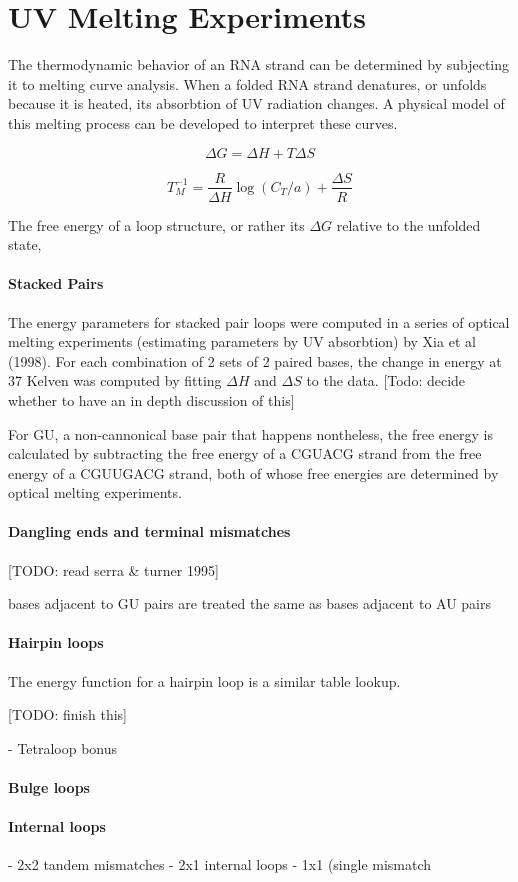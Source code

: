 \section{UV Melting Experiments}

The thermodynamic behavior of an RNA strand can be determined by
subjecting it to melting curve analysis. When a folded RNA strand
denatures, or unfolds because it is heated, its absorbtion of UV
radiation changes. A physical model of this melting process can be
developed to interpret these curves.

\begin{equation}
\Delta G = \Delta H + T \Delta S
\end{equation}

\begin{equation}
T_M^{-1} = \frac{R}{\Delta H} \log{(C_T/a)} + \frac{\Delta S}{R}
\end{equation}

The free energy of a loop structure, or rather its $\Delta G$ relative
to the unfolded state,

\paragraph{Stacked Pairs}

The energy parameters for stacked pair loops were computed in a series
of optical melting experiments (estimating parameters by UV
absorbtion) by Xia et al (1998). For each combination of 2 sets of 2
paired bases, the change in energy at 37 Kelven was computed by
fitting $\Delta H$ and $\Delta S$ to the data. [Todo: decide whether
to have an in depth discussion of this]

For GU, a non-cannonical base pair that happens nontheless, the free
energy is calculated by subtracting the free energy of a CGUACG strand
from the free energy of a CGUUGACG strand, both of whose free energies
are determined by optical melting experiments.


\paragraph{Dangling ends and terminal mismatches}

[TODO: read serra \& turner 1995]

bases adjacent to GU pairs are treated the same as bases adjacent to AU pairs

\paragraph{Hairpin loops}

The energy function for a hairpin loop is a similar table lookup.

[TODO: finish this]

- Tetraloop bonus

\paragraph{Bulge loops}

\paragraph{Internal loops}
- 2x2 tandem mismatches
- 2x1 internal loops
- 1x1 (single mismatch

